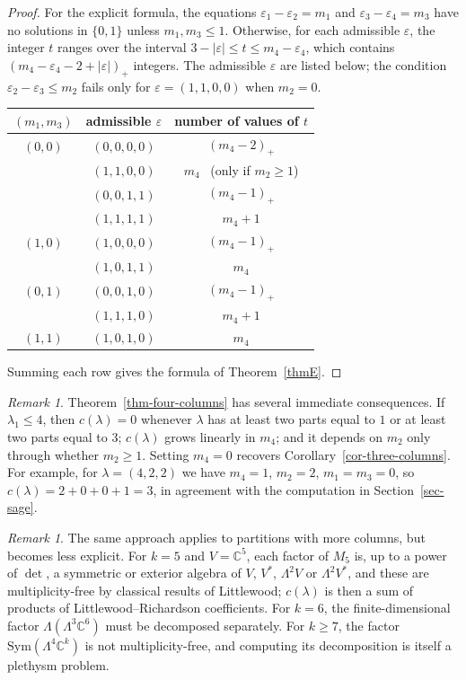 \documentclass[reqno]{amsart}
\theoremstyle{plain}
\theoremstyle{definition}
\theoremstyle{remark}
\newtheorem{remark}[theorem]{Remark}
\theoremstyle{plain}
\newcommand{\C}{\mathbb{C}}
\begin{document}
\begin{proof}
\medskip
For the explicit formula, the equations $\varepsilon_1-\varepsilon_2=m_1$ and
$\varepsilon_3-\varepsilon_4=m_3$ have no solutions in $\{0,1\}$ unless
$m_1,m_3\le1$. Otherwise, for each admissible $\varepsilon$, the integer $t$
ranges over the interval $3-|\varepsilon|\le t\le m_4-\varepsilon_4$, which
contains $(m_4-\varepsilon_4-2+|\varepsilon|)_+$ integers. The admissible
$\varepsilon$ are listed below; the condition $\varepsilon_2-\varepsilon_3\le m_2$
fails only for $\varepsilon=(1,1,0,0)$ when $m_2=0$.
\begin{center}
\renewcommand{\arraystretch}{1.3}
\begin{tabular}{c|c|c}
$(m_1,m_3)$ & admissible $\varepsilon$ & number of values of $t$\\\hline
$(0,0)$ & $(0,0,0,0)$ & $(m_4-2)_+$\\
        & $(1,1,0,0)$ & $m_4$ \ (only if $m_2\ge1$)\\
        & $(0,0,1,1)$ & $(m_4-1)_+$\\
        & $(1,1,1,1)$ & $m_4+1$\\\hline
$(1,0)$ & $(1,0,0,0)$ & $(m_4-1)_+$\\
        & $(1,0,1,1)$ & $m_4$\\\hline
$(0,1)$ & $(0,0,1,0)$ & $(m_4-1)_+$\\
        & $(1,1,1,0)$ & $m_4+1$\\\hline
$(1,1)$ & $(1,0,1,0)$ & $m_4$
\end{tabular}
\end{center}
\smallskip
\noindent Summing each row gives the formula of Theorem~\ref{thmE}.
\end{proof}

\begin{remark}
Theorem~\ref{thm-four-columns} has several immediate consequences. If
$\lambda_1\le4$, then $c(\lambda)=0$ whenever $\lambda$ has at least two parts
equal to $1$ or at least two parts equal to $3$; $c(\lambda)$ grows linearly in
$m_4$; and it depends on $m_2$ only through whether $m_2\ge1$. Setting $m_4=0$
recovers Corollary~\ref{cor-three-columns}. For example, for $\lambda=(4,2,2)$
we have $m_4=1$, $m_2=2$, $m_1=m_3=0$, so $c(\lambda)=2+0+0+1=3$, in agreement
with the computation in Section~\ref{sec-sage}.
\end{remark}

\begin{remark}
The same approach applies to partitions with more columns, but becomes less
explicit. For $k=5$ and $V=\C^5$, each factor of $M_5$ is, up to a power of
$\det$, a symmetric or exterior algebra of $V$, $V^*$, $\Lambda^2V$ or
$\Lambda^2V^*$, and these
are multiplicity-free by classical results of Littlewood; $c(\lambda)$ is then
a sum of products of Littlewood--Richardson coefficients. For $k=6$, the
finite-dimensional factor $\Lambda(\Lambda^3\C^6)$ must be decomposed
separately. For $k\ge7$, the factor $\mathrm{Sym}(\Lambda^4\C^k)$ is not
multiplicity-free, and computing its decomposition is itself a plethysm
problem.
\end{remark}
\end{document}
